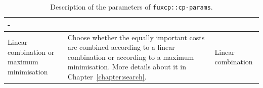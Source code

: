 \begin{table}[h!]
\begin{adjustbox}{center}
\begin{tabular}{|m{}|m{}|m{}<{\centering}|}
          - \\ \hline
        \hline
        \cellcolor[HTML]{fff078}Linear combination or maximum minimisation &
          Choose whether the equally important costs are combined according to a linear combination or according to a maximum minimisation. More details about it in Chapter~\ref{chapter:search}.&
          Linear combination \\ \hline
        \end{tabular}
    \end{adjustbox}
    \caption{Description of the parameters of \texttt{fuxcp::cp-params}.}
    \label{tab:cp-params}
\end{table}

